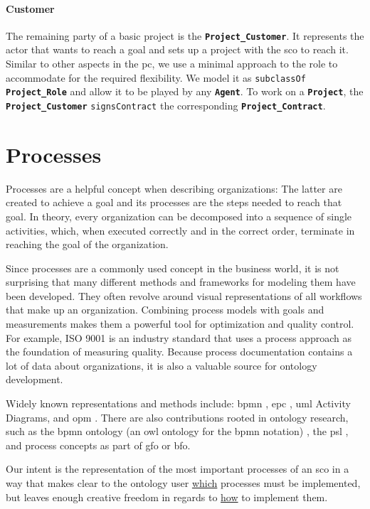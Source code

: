 \documentclass[a4paper, DIV=13, BCOR=0cm]{scrbook}
\newcommand{\class}[1]{\texttt{\textbf{#1}}}
\newcommand{\relation}[1]{\texttt{#1}}
\begin{document}
\paragraph{Customer}
The remaining party of a basic project is the \class{Project\_Customer}. It represents the actor that wants to reach a goal and sets up a project with the \gls{sco} to reach it. Similar to other aspects in the \gls{pc}, we use a minimal approach to the role to accommodate for the required flexibility. We model it as \relation{subclassOf} \class{Project\_Role} and allow it to be played by any \class{Agent}. To work on a \class{Project}, the \class{Project\_Customer} \relation{signsContract} the corresponding \class{Project\_Contract}.

\section{Processes}
\label{processes}
Processes are a helpful concept when describing organizations: The latter are created to achieve a goal and its processes are the steps needed to reach that goal. \cite[p.\,5, Definition 1.1]{Weske:2019aa} In theory, every organization can be decomposed into a sequence of single activities, which, when executed correctly and in the correct order, terminate in reaching the goal of the organization.

Since processes are a commonly used concept in the business world, it is not surprising that many different methods and frameworks for modeling them have been developed. They often revolve around visual representations of all workflows that make up an organization. Combining process models with goals and measurements makes them a powerful tool for optimization and quality control. For example, ISO 9001 is an industry standard that uses a process approach as the foundation of measuring quality. \cite{iso-process-approach} Because process documentation contains a lot of data about organizations, it is also a valuable source for ontology development.

Widely known representations and methods include: \gls{bpmn} \cite{iso2013iec}, \gls{epc} \cite{scheer2013aris}, \gls{uml} \cite{iso2005iec} Activity Diagrams, and \gls{opm} \cite{iso2015iso}. There are also contributions rooted in ontology research, such as the \gls{bpmn} ontology (an \gls{owl} ontology for the \gls{bpmn} notation) \cite{2014foisbpmn}, the \gls{psl} \cite{pouchard2005iso}, and process concepts as part of \gls{gfo} or \gls{bfo}.

Our intent is the representation of the most important processes of an \gls{sco} in a way that makes clear to the ontology user \underline{which} processes must be implemented, but leaves enough creative freedom in regards to \underline{how} to implement them.
\end{document}
